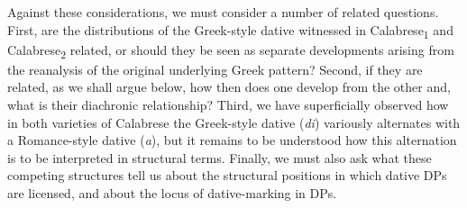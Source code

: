 \documentclass[output=paper,modfonts,nonflat]{langsci/langscibook}
\begin{document}
\begin{styleStandard}
Against these considerations, we must consider a number of related questions. First, are the distributions of the Greek-style dative witnessed in Calabrese\textsubscript{1} and Calabrese\textsubscript{2} related, or should they be seen as separate developments arising from the reanalysis of the original underlying Greek pattern? Second, if they are related, as we shall argue below, how then does one develop from the other and, what is their diachronic relationship? Third, we have superficially observed how in both varieties of Calabrese the Greek-style dative (\textit{di}) variously alternates with a Romance-style dative (\textit{a}), but it remains to be understood how this alternation is to be interpreted in structural terms. Finally, we must also ask what these competing structures tell us about the structural positions in which dative DPs are licensed, and about the locus of dative-marking in DPs.
\end{styleStandard}
\end{document}
